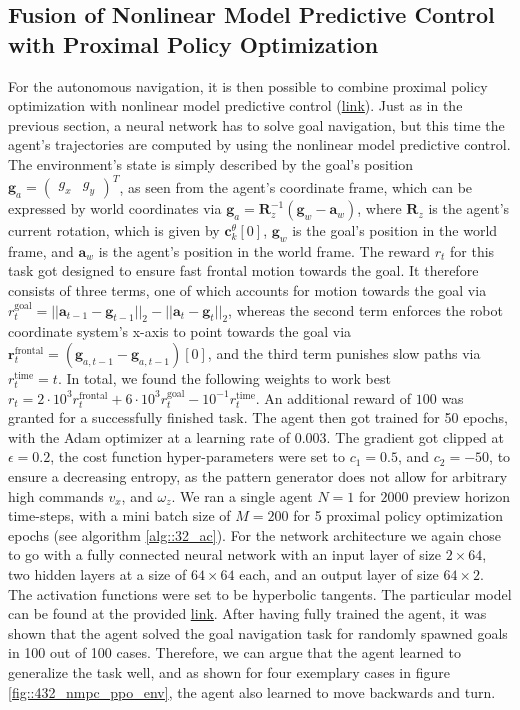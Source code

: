 \subsection{Fusion of Nonlinear Model Predictive Control with Proximal Policy Optimization}
\label{sec::431_fpp}
For the autonomous navigation, it is then possible to combine proximal policy optimization with nonlinear model predictive control (\href{https://github.com/mhubii/nmpc_pattern_generator/blob/dev/src/train_ppo_nmpc.cpp}{\underline{link}}). Just as in the previous section, a neural network has to solve goal navigation, but this time the agent's trajectories are computed by using the nonlinear model predictive control. The environment's state is simply described by the goal's position $\bm{g}_a=\begin{pmatrix}
g_x & g_y
\end{pmatrix}^T$, as seen from the agent's coordinate frame, which can be expressed by world coordinates via $\bm{g}_a = \bm{R}^{-1}_z(\bm{g}_w-\bm{a}_w)$, where $\bm{R}_z$ is the agent's current rotation, which is given by $\bm{c}_k^\theta[0]$, $\bm{g}_w$ is the goal's position in the world frame, and $\bm{a}_w$ is the agent's position in the world frame. The reward $r_t$ for this task got designed to ensure fast frontal motion towards the goal. It therefore consists of three terms, one of which accounts for motion towards the goal via $r_t^\text{goal} = ||\bm{a}_{t-1}-\bm{g}_{t-1}||_2 - ||\bm{a}_t-\bm{g}_t||_2$, whereas the second term enforces the robot coordinate system's x-axis to point towards the goal via $\bm{r}_t^\text{frontal} = (\bm{g}_{a,t-1}-\bm{g}_{a,t-1})[0]$, and the third term punishes slow paths via $r_t^\text{time}=t$. In total, we found the following weights to work best $r_t=2\cdot10^3r_t^\text{frontal}+6\cdot10^3r_t^\text{goal}-10^{-1}r_t^\text{time}$. An additional reward of $100$ was granted for a successfully finished task. The agent then got trained for 50 epochs, with the Adam optimizer at a learning rate of 0.003. The gradient got clipped at $\epsilon=0.2$, the cost function hyper-parameters were set to $c_1=0.5$, and $c_2=-50$, to ensure a decreasing entropy, as the pattern generator does not allow for arbitrary high commands $v_x$, and $\omega_z$. We ran a single agent $N=1$ for $2000$ preview horizon time-steps, with a mini batch size of $M=200$ for 5 proximal policy optimization epochs (see algorithm \ref{alg::32_ac}). For the network architecture we again chose to go with a fully connected neural network with an input layer of size $2\times64$, two hidden layers at a size of $64\times64$ each, and an output layer of size $64\times2$. The activation functions were set to be hyperbolic tangents. The particular model can be found at the provided \href{https://github.com/mhubii/nmpc_pattern_generator/blob/df058feeb5ba3afd88f2a855e5af148d25c23020/libs/learning/include/learning/models.h#L100}{\underline{link}}. After having fully trained the agent, it was shown that the agent solved the goal navigation task for randomly spawned goals in 100 out of 100 cases. Therefore, we can argue that the agent learned to generalize the task well, and as shown for four exemplary cases in figure \ref{fig::432_nmpc_ppo_env}, the agent also learned to move backwards and turn. 
